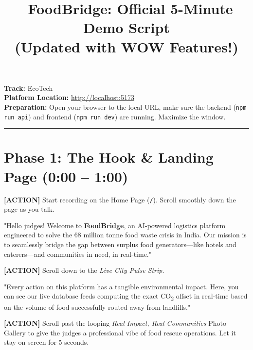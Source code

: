 \documentclass[12pt,a4paper]{article}
\begin{document}
\title{\Huge\bfseries \faFilm\ FoodBridge: Official 5-Minute Demo Script \\ \Large (Updated with WOW Features!)}
\date{}
\maketitle
\vspace{-4em}

\noindent
\textbf{Track:} EcoTech \\
\textbf{Platform Location:} \url{http://localhost:5173} \\
\textbf{Preparation:} Open your browser to the local URL, make sure the backend (\texttt{npm run api}) and frontend (\texttt{npm run dev}) are running. Maximize the window.

\vspace{1em}
\hrule
\vspace{1em}

\section*{Phase 1: The Hook \& Landing Page (0:00 – 1:00)}

\noindent\textcolor{action}{\textbf{[ACTION]}} Start recording on the Home Page (\texttt{/}). Scroll smoothly down the page as you talk.

\begin{scriptbox}
"Hello judges! Welcome to \textbf{FoodBridge}, an AI-powered logistics platform engineered to solve the 68 million tonne food waste crisis in India. Our mission is to seamlessly bridge the gap between surplus food generators—like hotels and caterers—and communities in need, in real-time."
\end{scriptbox}

\noindent\textcolor{action}{\textbf{[ACTION]}} Scroll down to the \textit{Live City Pulse Strip}.

\begin{scriptbox}
"Every action on this platform has a tangible environmental impact. Here, you can see our live database feeds computing the exact CO\textsubscript{2} offset in real-time based on the volume of food successfully routed away from landfills."
\end{scriptbox}

\noindent\textcolor{action}{\textbf{[ACTION]}} Scroll past the looping \textit{Real Impact, Real Communities} Photo Gallery to give the judges a professional vibe of food rescue operations. Let it stay on screen for 5 seconds.
\end{document}
